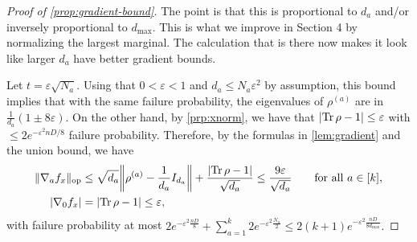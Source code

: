 \documentclass[aos]{imsart}
\theoremstyle{definition}
\numberwithin{equation}{section}
\DeclareMathOperator{\op}{op}
\DeclareMathOperator{\tr}{Tr}
\DeclarePairedDelimiter{\abs}{\lvert}{\rvert}
\DeclarePairedDelimiter{\norm}{\lVert}{\rVert}
\newcommand{\eps}{\varepsilon}
\begin{document}
\begin{proof}[Proof of \cref{prop:gradient-bound}]
{The point is that this is proportional to $d_{a}$ and/or inversely proportional to $d_{\max}$. This is what we improve in Section 4 by normalizing the largest marginal. The calculation that is there now makes it look like larger $d_{a}$ have better gradient bounds. }


Let $t = \eps \sqrt{N_a}$.
Using that $0<\eps<1$ and $d_a \leq N_a \eps^2$ by assumption, this bound implies that
with the same failure probability, the eigenvalues of $\rho^{(a)}$ are in $\frac1{d_a}(1\pm8\eps)$.
On the other hand, by \cref{prp:xnorm}, we have that $\abs{\tr \rho - 1} \leq \eps$ with $\leq 2e^{-\eps^2 nD/8}$ failure probability.
Therefore, by the formulas in \cref{lem:gradient} and the union bound, we have
\begin{align*}
  \norm{\nabla_a f_x}_{\op}
&\leq\sqrt{d_a} \norm*{\rho^{(a)} - \frac1{d_a} I_{d_a}} + \frac{\abs{\tr\rho - 1}}{\sqrt{d_a}}
\leq\frac{9\eps}{\sqrt{d_a}} \qquad \text{for all } a\in[k], \\
  \abs{\nabla_0 f_x}
&=\abs{\tr \rho - 1} \leq \eps,
\end{align*}
with failure probability at most
$2e^{-\eps^2 \frac{nD}8} + \sum_{a=1}^k 2 e^{-\eps^2 \frac{N_a}2}
\leq 2(k+1)e^{-\eps^2 \frac{nD}{8d_{\max}}}.$
\end{proof}

\end{document}
